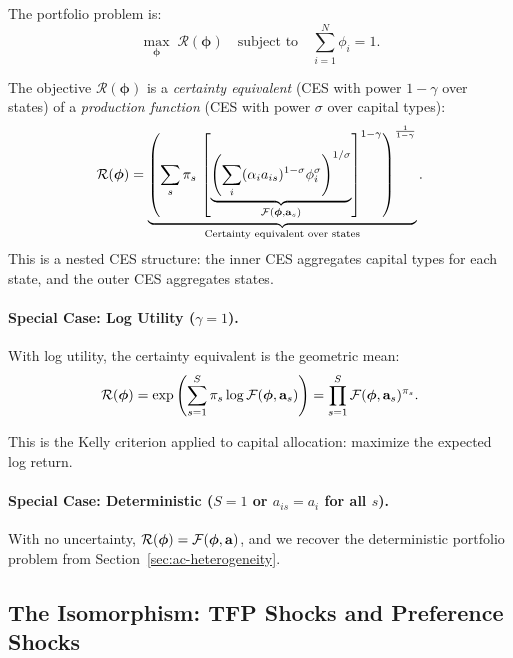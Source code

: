 The portfolio problem is:
\begin{equation}
\max_{\boldsymbol{\phi}} \; \mathcal{R}(\boldsymbol{\phi}) \quad \text{subject to} \quad \sum_{i=1}^{N} \phi_i = 1.
\label{eq:ac-risk-portfolio}
\end{equation}

\begin{calloutimportant}
The objective $\mathcal{R}(\boldsymbol{\phi})$ is a \emph{certainty equivalent} (CES with power $1-\gamma$ over states) of a \emph{production function} (CES with power $\sigma$ over capital types):
\[
\mathcal{R}(\boldsymbol{\phi}) = \underbrace{\left( \sum_{s} \pi_s \, \left[ \underbrace{\left( \sum_{i} (\alpha_i a_{is})^{1-\sigma} \phi_i^{\sigma} \right)^{1/\sigma}}_{\mathcal{F}(\boldsymbol{\phi}, \mathbf{a}_s)} \right]^{1-\gamma} \right)^{\frac{1}{1-\gamma}}}_{\text{Certainty equivalent over states}}.
\]
This is a nested CES structure: the inner CES aggregates capital types for each state, and the outer CES aggregates states.
\end{calloutimportant}

\paragraph{Special Case: Log Utility ($\gamma = 1$).}
With log utility, the certainty equivalent is the geometric mean:
\begin{equation}
\mathcal{R}(\boldsymbol{\phi}) = \exp\left( \sum_{s=1}^{S} \pi_s \log \mathcal{F}(\boldsymbol{\phi}, \mathbf{a}_s) \right) = \prod_{s=1}^{S} \mathcal{F}(\boldsymbol{\phi}, \mathbf{a}_s)^{\pi_s}.
\label{eq:ac-risk-R-log}
\end{equation}

This is the Kelly criterion applied to capital allocation: maximize the expected log return.

\paragraph{Special Case: Deterministic ($S = 1$ or $a_{is} = a_i$ for all $s$).}
With no uncertainty, $\mathcal{R}(\boldsymbol{\phi}) = \mathcal{F}(\boldsymbol{\phi}, \mathbf{a})$, and we recover the deterministic portfolio problem from Section~\ref{sec:ac-heterogeneity}.

\subsection{The Isomorphism: TFP Shocks and Preference Shocks}
\label{subsec:ac-risk-isomorphism}

